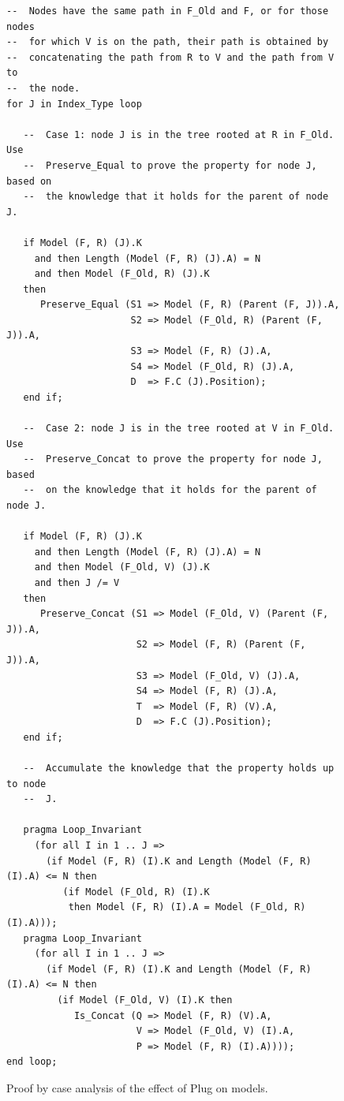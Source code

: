\documentclass[11pt,a4paper]{article}
\begin{document}
\begin{figure}
\begin{small}
\begin{lstlisting}
--  Nodes have the same path in F_Old and F, or for those nodes
--  for which V is on the path, their path is obtained by
--  concatenating the path from R to V and the path from V to
--  the node.
for J in Index_Type loop

   --  Case 1: node J is in the tree rooted at R in F_Old. Use
   --  Preserve_Equal to prove the property for node J, based on
   --  the knowledge that it holds for the parent of node J.

   if Model (F, R) (J).K
     and then Length (Model (F, R) (J).A) = N
     and then Model (F_Old, R) (J).K
   then
      Preserve_Equal (S1 => Model (F, R) (Parent (F, J)).A,
                      S2 => Model (F_Old, R) (Parent (F, J)).A,
                      S3 => Model (F, R) (J).A,
                      S4 => Model (F_Old, R) (J).A,
                      D  => F.C (J).Position);
   end if;

   --  Case 2: node J is in the tree rooted at V in F_Old. Use
   --  Preserve_Concat to prove the property for node J, based
   --  on the knowledge that it holds for the parent of node J.

   if Model (F, R) (J).K
     and then Length (Model (F, R) (J).A) = N
     and then Model (F_Old, V) (J).K
     and then J /= V
   then
      Preserve_Concat (S1 => Model (F_Old, V) (Parent (F, J)).A,
                       S2 => Model (F, R) (Parent (F, J)).A,
                       S3 => Model (F_Old, V) (J).A,
                       S4 => Model (F, R) (J).A,
                       T  => Model (F, R) (V).A,
                       D  => F.C (J).Position);
   end if;

   --  Accumulate the knowledge that the property holds up to node
   --  J.

   pragma Loop_Invariant
     (for all I in 1 .. J =>
       (if Model (F, R) (I).K and Length (Model (F, R) (I).A) <= N then
          (if Model (F_Old, R) (I).K
           then Model (F, R) (I).A = Model (F_Old, R) (I).A)));
   pragma Loop_Invariant
     (for all I in 1 .. J =>
       (if Model (F, R) (I).K and Length (Model (F, R) (I).A) <= N then
         (if Model (F_Old, V) (I).K then
            Is_Concat (Q => Model (F, R) (V).A,
                       V => Model (F_Old, V) (I).A,
                       P => Model (F, R) (I).A))));
end loop;
\end{lstlisting}
\end{small}
\caption{\label{fig-proof-ca} Proof by case analysis of the effect of Plug on models.}
\end{figure}
\end{document}
